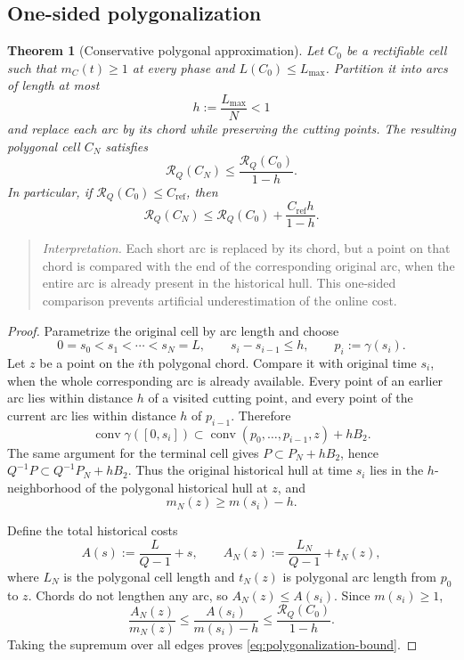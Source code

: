 \documentclass[10pt,a4paper]{article}
\newtheorem{theorem}{Theorem}[section]
\theoremstyle{definition}
\theoremstyle{remark}
\DeclareMathOperator{\conv}{conv}
\newcommand{\cellratio}{\mathcal{R}}
\begin{document}
\subsection{One-sided polygonalization}
\begin{theorem}[Conservative polygonal approximation]
\label{thm:polygonalization}
Let $C_0$ be a rectifiable cell such that $m_C(t)\ge1$ at every phase and $L(C_0)\le L_{\max}$. Partition it into arcs of length at most
\[
h:=\frac{L_{\max}}{N}<1
\]
and replace each arc by its chord while preserving the cutting points. The resulting polygonal cell $C_N$ satisfies
\begin{equation}
\cellratio_Q(C_N)\le\frac{\cellratio_Q(C_0)}{1-h}.
\label{eq:polygonalization-bound}
\end{equation}
In particular, if $\cellratio_Q(C_0)\le C_{\mathrm{ref}}$, then
\[
\cellratio_Q(C_N)
\le \cellratio_Q(C_0)+\frac{C_{\mathrm{ref}}h}{1-h}.
\]
\end{theorem}

\begin{quote}\small
\textit{Interpretation.} Each short arc is replaced by its chord, but a point on that chord is compared with the end of the corresponding original arc, when the entire arc is already present in the historical hull. This one-sided comparison prevents artificial underestimation of the online cost.
\end{quote}

\begin{proof}
Parametrize the original cell by arc length and choose
\[
0=s_0<s_1<\cdots<s_N=L,
\qquad
s_i-s_{i-1}\le h,
\qquad
p_i:=\gamma(s_i).
\]
Let $z$ be a point on the $i$th polygonal chord. Compare it with original time $s_i$, when the whole corresponding arc is already available. Every point of an earlier arc lies within distance $h$ of a visited cutting point, and every point of the current arc lies within distance $h$ of $p_{i-1}$. Therefore
\begin{equation}
\conv\gamma([0,s_i])
\subset
\conv(p_0,\ldots,p_{i-1},z)+hB_2.
\label{eq:hull-neighborhood}
\end{equation}
The same argument for the terminal cell gives $P\subset P_N+hB_2$, hence $Q^{-1}P\subset Q^{-1}P_N+hB_2$. Thus the original historical hull at time $s_i$ lies in the $h$-neighborhood of the polygonal historical hull at $z$, and
\begin{equation}
m_N(z)\ge m(s_i)-h.
\label{eq:inradius-loss}
\end{equation}

Define the total historical costs
\[
A(s):=\frac{L}{Q-1}+s,
\qquad
A_N(z):=\frac{L_N}{Q-1}+t_N(z),
\]
where $L_N$ is the polygonal cell length and $t_N(z)$ is polygonal arc length from $p_0$ to $z$.
Chords do not lengthen any arc, so $A_N(z)\le A(s_i)$. Since $m(s_i)\ge1$,
\[
\frac{A_N(z)}{m_N(z)}
\le
\frac{A(s_i)}{m(s_i)-h}
\le
\frac{\cellratio_Q(C_0)}{1-h}.
\]
Taking the supremum over all edges proves \eqref{eq:polygonalization-bound}.
\end{proof}
\end{document}
